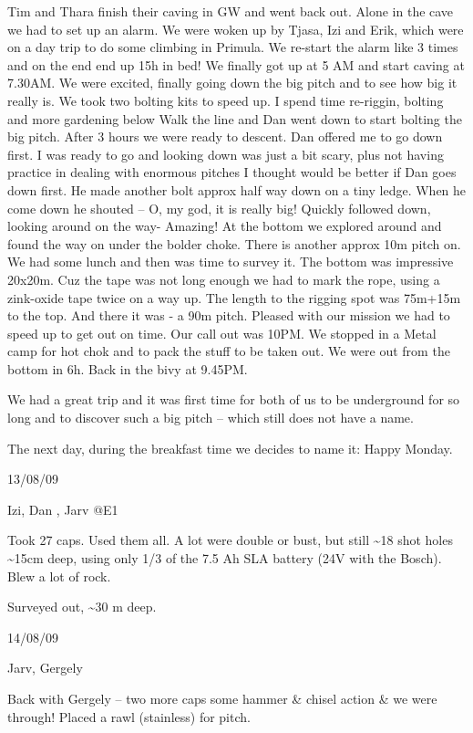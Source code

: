 Tim and Thara finish their caving in GW and went back out. Alone in the
cave we had to set up an alarm. We were woken up by Tjasa, Izi and Erik,
which were on a day trip to do some climbing in Primula. We re-start the
alarm like 3 times and on the end end up 15h in bed! We finally got up
at 5 AM and start caving at 7.30AM. We were excited, finally going down
the big pitch and to see how big it really is. We took two bolting kits
to speed up. I spend time re-riggin, bolting and more gardening below
Walk the line and Dan went down to start bolting the big pitch. After 3
hours we were ready to descent. Dan offered me to go down first. I was
ready to go and looking down was just a bit scary, plus not having
practice in dealing with enormous pitches I thought would be better if
Dan goes down first. He made another bolt approx half way down on a tiny
ledge. When he come down he shouted -- O, my god, it is really big!
Quickly followed down, looking around on the way- Amazing! At the bottom
we explored around and found the way on under the bolder choke. There is
another approx 10m pitch on. We had some lunch and then was time to
survey it. The bottom was impressive 20x20m. Cuz the tape was not long
enough we had to mark the rope, using a zink-oxide tape twice on a way
up. The length to the rigging spot was 75m+15m to the top. And there it
was - a 90m pitch. Pleased with our mission we had to speed up to get
out on time. Our call out was 10PM. We stopped in a Metal camp for hot
chok and to pack the stuff to be taken out. We were out from the bottom
in 6h. Back in the bivy at 9.45PM.

We had a great trip and it was first time for both of us to be
underground for so long and to discover such a big pitch -- which still
does not have a name.

The next day, during the breakfast time we decides to name it: Happy
Monday.


13/08/09

Izi, Dan , Jarv @E1

Took 27 caps. Used them all. A lot were double or bust, but still
\textasciitilde{}18 shot holes \textasciitilde{}15cm deep, using only
1/3 of the 7.5 Ah SLA battery (24V with the Bosch). Blew a lot of rock.

Surveyed out, \textasciitilde{}30 m deep.

14/08/09

Jarv, Gergely

Back with Gergely -- two more caps some hammer \& chisel action \& we
were through! Placed a rawl (stainless) for pitch.

